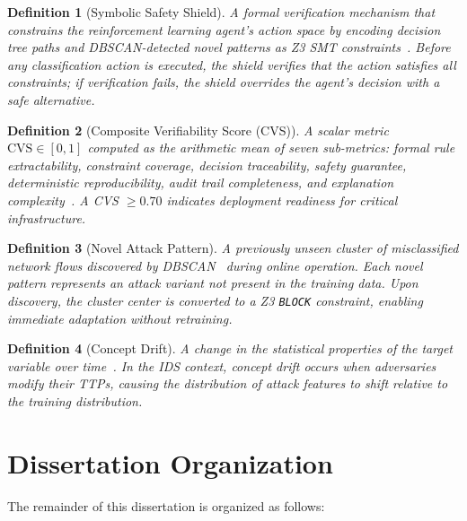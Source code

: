 \documentclass[12pt, letterpaper, oneside]{report}
\newtheorem{definition}{Definition}[chapter]
\begin{document}
\begin{definition}[Symbolic Safety Shield]
A formal verification mechanism that constrains the reinforcement learning agent's action space by encoding decision tree paths and DBSCAN-detected novel patterns as Z3 SMT constraints~\cite{demoura2008, alshiekh2018}. Before any classification action is executed, the shield verifies that the action satisfies all constraints; if verification fails, the shield overrides the agent's decision with a safe alternative.
\end{definition}

\begin{definition}[Composite Verifiability Score (CVS)]
A scalar metric $\text{CVS} \in [0, 1]$ computed as the arithmetic mean of seven sub-metrics: formal rule extractability, constraint coverage, decision traceability, safety guarantee, deterministic reproducibility, audit trail completeness, and explanation complexity~\cite{young2025adaptive}. A CVS $\geq 0.70$ indicates deployment readiness for critical infrastructure.
\end{definition}

\begin{definition}[Novel Attack Pattern]
A previously unseen cluster of misclassified network flows discovered by DBSCAN~\cite{ester1996} during online operation. Each novel pattern represents an attack variant not present in the training data. Upon discovery, the cluster center is converted to a Z3 \texttt{BLOCK} constraint, enabling immediate adaptation without retraining.
\end{definition}

\begin{definition}[Concept Drift]
A change in the statistical properties of the target variable over time~\cite{jordaney2017}. In the IDS context, concept drift occurs when adversaries modify their TTPs, causing the distribution of attack features to shift relative to the training distribution.
\end{definition}


\section{Dissertation Organization}
\label{sec:organization}

The remainder of this dissertation is organized as follows:
\end{document}
